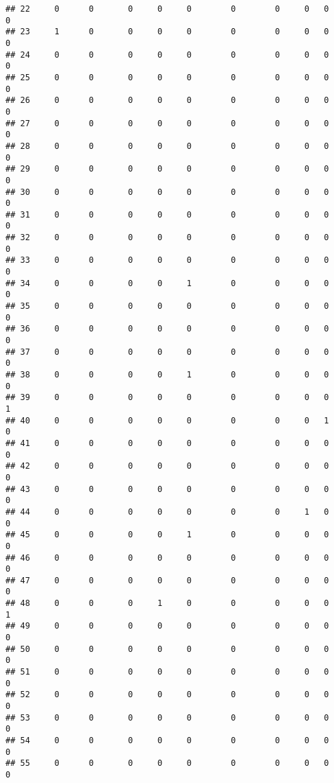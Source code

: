 \documentclass[
]{article}
\begin{document}
\begin{verbatim}
## 22     0      0       0     0     0        0        0     0   0         0
## 23     1      0       0     0     0        0        0     0   0         0
## 24     0      0       0     0     0        0        0     0   0         0
## 25     0      0       0     0     0        0        0     0   0         0
## 26     0      0       0     0     0        0        0     0   0         0
## 27     0      0       0     0     0        0        0     0   0         0
## 28     0      0       0     0     0        0        0     0   0         0
## 29     0      0       0     0     0        0        0     0   0         0
## 30     0      0       0     0     0        0        0     0   0         0
## 31     0      0       0     0     0        0        0     0   0         0
## 32     0      0       0     0     0        0        0     0   0         0
## 33     0      0       0     0     0        0        0     0   0         0
## 34     0      0       0     0     1        0        0     0   0         0
## 35     0      0       0     0     0        0        0     0   0         0
## 36     0      0       0     0     0        0        0     0   0         0
## 37     0      0       0     0     0        0        0     0   0         0
## 38     0      0       0     0     1        0        0     0   0         0
## 39     0      0       0     0     0        0        0     0   0         1
## 40     0      0       0     0     0        0        0     0   1         0
## 41     0      0       0     0     0        0        0     0   0         0
## 42     0      0       0     0     0        0        0     0   0         0
## 43     0      0       0     0     0        0        0     0   0         0
## 44     0      0       0     0     0        0        0     1   0         0
## 45     0      0       0     0     1        0        0     0   0         0
## 46     0      0       0     0     0        0        0     0   0         0
## 47     0      0       0     0     0        0        0     0   0         0
## 48     0      0       0     1     0        0        0     0   0         1
## 49     0      0       0     0     0        0        0     0   0         0
## 50     0      0       0     0     0        0        0     0   0         0
## 51     0      0       0     0     0        0        0     0   0         0
## 52     0      0       0     0     0        0        0     0   0         0
## 53     0      0       0     0     0        0        0     0   0         0
## 54     0      0       0     0     0        0        0     0   0         0
## 55     0      0       0     0     0        0        0     0   0         0

\end{verbatim}
\end{document}
